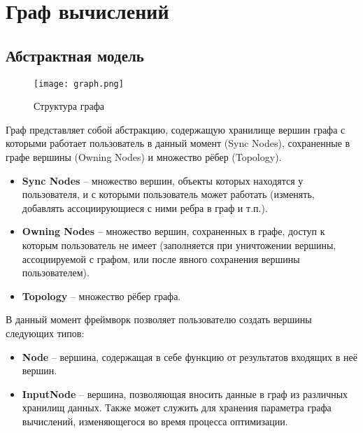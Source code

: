 \clearpage

\section{Граф вычислений}
\subsection{Абстрактная модель}
\label{sec:abstractmodel}
\begin{figure}[ht]
    \centering
    \texttt{[image: graph.png]}
    \caption{Структура графа}
    \label{fig:graphstructure}
\end{figure}
Граф представляет собой абстракцию, содержащую хранилище вершин графа с которыми работает пользователь в данный момент (Sync Nodes), сохраненные в графе вершины (Owning Nodes) и множество рёбер (Topology).
\begin{itemize}
    \item \textbf{Sync Nodes} -- множество вершин, объекты которых находятся у пользователя, и с которыми пользователь может работать (изменять, добавлять ассоциирующиеся с ними ребра в граф и т.п.).
    \item \textbf{Owning Nodes} -- множество вершин, сохраненных в графе, доступ к которым пользователь не имеет (заполняется при уничтожении вершины, ассоциируемой с графом, или после явного сохранения вершины пользователем).
    \item \textbf{Topology} -- множество рёбер графа.
\end{itemize}
В данный момент фреймворк позволяет пользователю создать вершины следующих типов:
\begin{itemize}
	\item \textbf{Node} -- вершина, содержащая в себе функцию от результатов входящих в неё вершин.
	\item \textbf{InputNode} -- вершина, позволяющая вносить данные в граф из различных хранилищ данных. Также может служить для хранения параметра графа вычислений, изменяющегося во время процесса оптимизации. 
\end{itemize}
